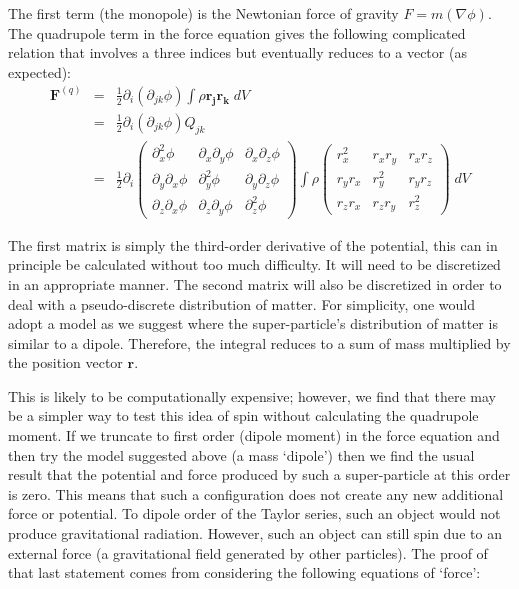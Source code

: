 \noindent The first term (the monopole) is the Newtonian force of gravity $F = m(\nabla\phi)$. The quadrupole term in the force equation gives the following complicated relation that involves a three indices but eventually reduces to a vector (as expected):
\begin{eqnarray}
\label{quadforce}
\mathbf{F}^{(q)} &=& \frac{1}{2}\partial_i(\partial_{jk} \phi) \int \rho \mathbf{r_j} \mathbf{r_k}\;dV \\
&=& \frac{1}{2}\partial_i(\partial_{jk} \phi) Q_{jk} \\
&=& \frac{1}{2}\partial_i \left(\begin{array}{ccc}
\partial_x^2 \phi & \partial_x \partial_y\phi & \partial_x \partial_z\phi  \\
\partial_y \partial_x\phi & \partial_y^2\phi & \partial_y\partial_z\phi \\
\partial_z \partial_x\phi & \partial_z \partial_y\phi & \partial_z^2\phi
\end{array}\right) \int \rho
\left(\begin{array}{ccc}
r_x^2 & r_x r_y & r_x r_z  \\
r_y r_x & r_y^2 & r_y r_z \\
r_z r_x & r_z r_y & r_z^2
\end{array}\right) \; dV
\end{eqnarray}

\noindent The first matrix is simply the third-order derivative of the potential, this can in principle be calculated without too much difficulty. It will need to be discretized in an appropriate manner. The second matrix will also be discretized in order to deal with a pseudo-discrete distribution of matter. For simplicity, one would adopt a model as we suggest where the super-particle's distribution of matter is similar to a dipole. Therefore, the integral reduces to a sum of mass multiplied by the position vector $\mathbf{r}$.

This is likely to be computationally expensive; however, we find that there may be a simpler way to test this idea of spin without calculating the quadrupole moment. If we truncate to first order (dipole moment) in the force equation and then try the model suggested above (a mass `dipole') then we find the usual result that the potential and force produced by such a super-particle at this order is zero. This means that such a configuration does not create any new additional force or potential. To dipole order of the Taylor series, such an object would not produce gravitational radiation. However, such an object can still spin due to an external force (a gravitational field generated by other particles). The proof of that last statement comes from considering the following equations of `force':


